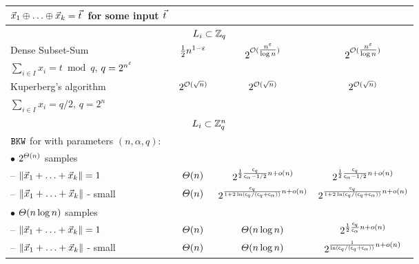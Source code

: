 \begin{table}[h]
{\begin{tabular}{|l | c | c | c |}
			\hspace{3pt} $\xvec_1 \oplus \ldots \oplus \xvec_k = \tvec$ for some input $\tvec$ &  &  & \\ \hline 
			\multicolumn{4}{|c|}{$L_i \subset {{\mathbb Z}}_q$} \\ \hline 
			Dense Subset-Sum \cite{Lyu05} & \multirow{2}{*}{ $\tfrac{1}{2} n ^{1-\varepsilon}$} & \multirow{2}{*}{$2^{\mathcal{O}(\tfrac{n^{\varepsilon}}{\log n})}$} &  \multirow{2}{*}{$2^{\mathcal{O}(\tfrac{n^{\varepsilon}}{\log n})}$} \\ 
			\hspace{3pt} $\sum_{i \in I} x_i = t \bmod q$, $q = 2^{n^{\varepsilon}}$ & & & \\ \hline
			Kuperberg's algorithm \cite{Kup05}  & \multirow{2}{*}{$2^{\mathcal{O}(\sqrt{n})}$}  & \multirow{2}{*}{$2^{\mathcal{O}(\sqrt{n})}$} & \multirow{2}{*}{$2^{\mathcal{O}(\sqrt{n})}$} \\ 
			\hspace{3pt} $\sum_{i \in I} x_i = q/2$, $q = 2^n$  & & & \\ \hline 
			\multicolumn{4}{|c|}{$L_i \subset {{\mathbb Z}}_q^n$} \\ \hline
			$\texttt{BKW}$ for \LWE with parameters $(n, \alpha, q)$: & & & \\
				\hspace{5pt} $\bullet$ $2^{\varTheta(n)}$ \LWE samples  & & & \\ 
				\hspace{15pt} -- $\| \vec x_1 + \ldots + \vec x_k \| = 1$ \cite{DCC:ACFFP15} & $\varTheta(n)$ & $2^{\frac{1}{2} \frac{\mathsf{c}_q}{\mathsf{c}_{\alpha} - 1/2}n + o(n) }$ & $2^{\frac{1}{2} \frac{\mathsf{c}_q}{\mathsf{c}_{\alpha} - 1/2}n + o(n) }$ \\ %
				\hspace{15pt} -- $\| \vec x_1 + \ldots + \vec x_k \|$ - small \cite{C:GuoJohSta15, C:KirFou15} & $\varTheta(n)$ & $2^{\frac{\mathsf{c}_q}{1+2 \ln(\mathsf{c}_q / (\mathsf{c}_q+\mathsf{c}_{\alpha}))} n + o(n)}$ & $2^{\frac{\mathsf{c}_q}{1+2 \ln(\mathsf{c}_q / (\mathsf{c}_q+\mathsf{c}_{\alpha}))} n + o(n)}$  \\ %
				\hspace{5pt} $\bullet$ $\varTheta(n \log n)$ \LWE samples & & & \\
				\hspace{15pt} -- $\| \vec x_1 + \ldots + \vec x_k \| = 1$ & $\varTheta(n)$ & $\varTheta(n \log n)$ & $2^{\frac{1}{2} \frac{\mathsf{c}_q}{\mathsf{c}_{\alpha}} n + o(n) }$ \\
				\hspace{15pt} -- $\| \vec x_1 + \ldots + \vec x_k \|$ - small \cite{DCC:HKM} & $\varTheta(n)$ & $\varTheta(n \log n)$ & $2^{\frac{1}{\ln(\mathsf{c}_q / (\mathsf{c}_q+\mathsf{c}_{\alpha}))} n + o(n)}$ \\  \hline  

\end{tabular}}
\end{table}
